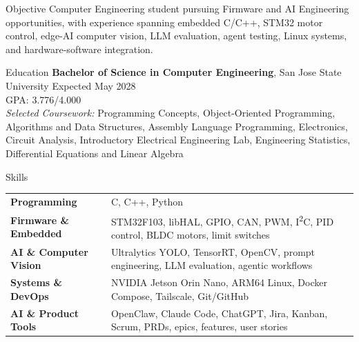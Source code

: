 \documentclass{resume}
\begin{document}
\begin{rSection}{Objective}
Computer Engineering student pursuing Firmware and AI Engineering opportunities, with experience spanning embedded C/C++, STM32 motor control, edge-AI computer vision, LLM evaluation, agent testing, Linux systems, and hardware-software integration.
\end{rSection}

\begin{rSection}{Education}
\textbf{Bachelor of Science in Computer Engineering}, San Jose State University \hfill Expected May 2028\\
GPA: 3.776/4.000\\
\textit{Selected Coursework:} Programming Concepts, Object-Oriented Programming, Algorithms and Data Structures, Assembly Language Programming, Electronics, Circuit Analysis, Introductory Electrical Engineering Lab, Engineering Statistics, Differential Equations and Linear Algebra
\end{rSection}

\begin{rSection}{Skills}
\begin{tabular}{@{} >{\bfseries}l @{\hspace{2ex}} p{}}
Programming & C, C++, Python \\
Firmware \& Embedded & STM32F103, libHAL, GPIO, CAN, PWM, I\textsuperscript{2}C, PID control, BLDC motors, limit switches \\
AI \& Computer Vision & Ultralytics YOLO, TensorRT, OpenCV, prompt engineering, LLM evaluation, agentic workflows \\
Systems \& DevOps & NVIDIA Jetson Orin Nano, ARM64 Linux, Docker Compose, Tailscale, Git/GitHub \\
AI \& Product Tools & OpenClaw, Claude Code, ChatGPT, Jira, Kanban, Scrum, PRDs, epics, features, user stories \\
\end{tabular}
\end{rSection}
\end{document}
